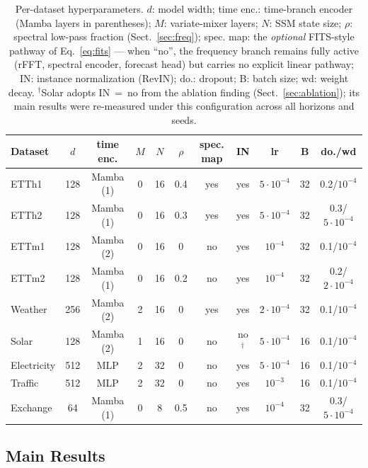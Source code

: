 \documentclass[runningheads]{llncs}
\begin{document}
\begin{table}[tb]
\centering
\caption{Per-dataset hyperparameters. $d$: model width; time enc.:
time-branch encoder (Mamba layers in parentheses); $M$: variate-mixer
layers; $N$: SSM state size; $\rho$: spectral low-pass fraction
(Sect.~\ref{sec:freq}); spec. map: the \emph{optional} FITS-style pathway of Eq.~\eqref{eq:fits}
--- when ``no'', the frequency branch remains fully active (rFFT, spectral
encoder, forecast head) but carries no explicit linear pathway; IN:
instance normalization (RevIN); do.: dropout; B: batch size; wd: weight
decay. $^{\dagger}$Solar adopts IN~=~no from the ablation finding
(Sect.~\ref{sec:ablation}); its main results were re-measured under this
configuration across all horizons and seeds.}
\label{tab:hparams}
\scriptsize
\setlength{\tabcolsep}{3.2pt}
\begin{tabular}{@{}lcccccccccc@{}}
\toprule
Dataset & $d$ & time enc. & $M$ & $N$ & $\rho$ & spec. map & IN & lr & B & do./wd \\
\midrule
ETTh1 & 128 & Mamba (1) & 0 & 16 & 0.4 & yes & yes & $5{\cdot}10^{-4}$ & 32 & 0.2/$10^{-4}$ \\
ETTh2 & 128 & Mamba (1) & 0 & 16 & 0.3 & yes & yes & $5{\cdot}10^{-4}$ & 32 & 0.3/$5{\cdot}10^{-4}$ \\
ETTm1 & 128 & Mamba (2) & 0 & 16 & 0 & no & yes & $10^{-4}$ & 32 & 0.1/$10^{-4}$ \\
ETTm2 & 128 & Mamba (1) & 0 & 16 & 0.2 & no & yes & $10^{-4}$ & 32 & 0.2/$2{\cdot}10^{-4}$ \\
Weather & 256 & Mamba (2) & 2 & 16 & 0 & yes & yes & $2{\cdot}10^{-4}$ & 32 & 0.1/$10^{-4}$ \\
Solar & 128 & Mamba (2) & 1 & 16 & 0 & no & no$^{\dagger}$ & $5{\cdot}10^{-4}$ & 16 & 0.1/$10^{-4}$ \\
Electricity & 512 & MLP & 2 & 32 & 0 & no & yes & $5{\cdot}10^{-4}$ & 16 & 0.1/$10^{-4}$ \\
Traffic & 512 & MLP & 2 & 32 & 0 & no & yes & $10^{-3}$ & 16 & 0.1/$10^{-4}$ \\
Exchange & 64 & Mamba (1) & 0 & 8 & 0.5 & no & yes & $10^{-4}$ & 32 & 0.3/$5{\cdot}10^{-4}$ \\
\bottomrule
\end{tabular}
\end{table}

\subsection{Main Results}
\end{document}
